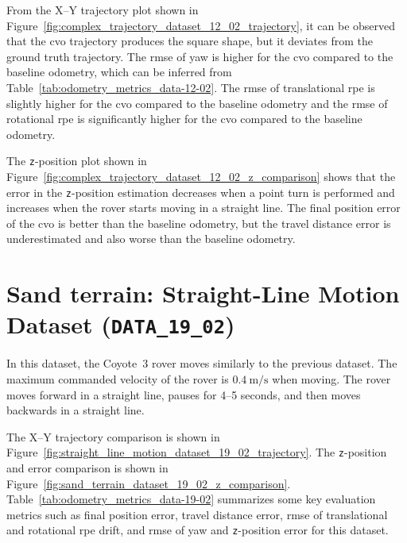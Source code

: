 \documentclass[report.tex]{subfiles}
\begin{document}


    From the X--Y trajectory plot shown in Figure~\ref{fig:complex_trajectory_dataset_12_02_trajectory}, it can be observed that the \gls{cvo} trajectory produces the square shape, but it deviates from the ground truth trajectory. The \gls{rmse} of yaw is higher for the \gls{cvo} compared to the baseline odometry, which can be inferred from Table~\ref{tab:odometry_metrics_data-12-02}. The \gls{rmse} of translational \gls{rpe} is slightly higher for the \gls{cvo} compared to the baseline odometry and the \gls{rmse} of rotational \gls{rpe} is significantly higher for the \gls{cvo} compared to the baseline odometry. 

    The \texttt{z}-position plot shown in Figure~\ref{fig:complex_trajectory_dataset_12_02_z_comparison} shows that the error in the \texttt{z}-position estimation decreases when a point turn is performed and increases when the rover starts moving in a straight line. The final position error of the \gls{cvo} is better than the baseline odometry, but the travel distance error is underestimated and also worse than the baseline odometry. 
    \FloatBarrier

    \section{Sand terrain: Straight-Line Motion Dataset (\texttt{DATA\_19\_02})} \label{subsubsec:straightLineMotionD2_19_02}
    
    In this dataset, the Coyote~3 rover moves similarly to the previous dataset. The maximum commanded velocity of the rover is $0.4~\mathrm{m/s}$ when moving. The rover moves forward in a straight line, pauses for 4--5 seconds, and then moves backwards in a straight line. 
    
    The X--Y trajectory comparison is shown in Figure~\ref{fig:straight_line_motion_dataset_19_02_trajectory}. The \texttt{z}-position and error comparison is shown in Figure~\ref{fig:sand_terrain_dataset_19_02_z_comparison}. Table~\ref{tab:odometry_metrics_data-19-02} summarizes some key evaluation metrics such as final position error, travel distance error, \gls{rmse} of translational and rotational \gls{rpe} drift, and \gls{rmse} of yaw and \texttt{z}-position error for this dataset.
    
\end{document}
